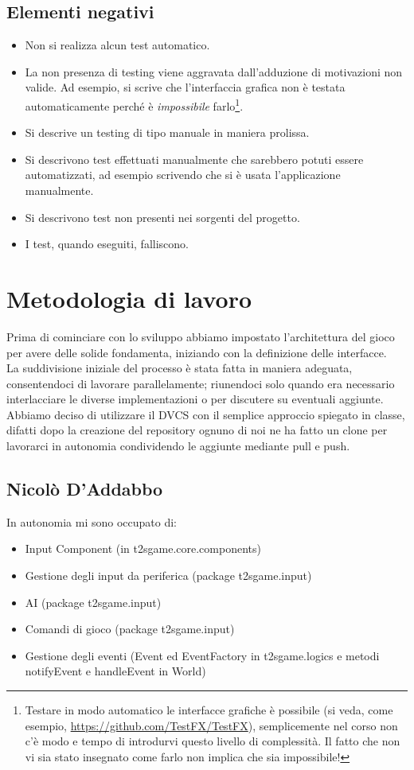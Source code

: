 \documentclass[a4paper,12pt]{report}
\begin{document}
\subsection*{Elementi negativi}
\begin{itemize}
 \item Non si realizza alcun test automatico.
 \item La non presenza di testing viene aggravata dall'adduzione di motivazioni non valide. Ad esempio, si scrive che l'interfaccia grafica non è testata automaticamente perché è \emph{impossibile} farlo\footnote{Testare in modo automatico le interfacce grafiche è possibile (si veda, come esempio, \url{https://github.com/TestFX/TestFX}), semplicemente nel corso non c'è modo e tempo di introdurvi questo livello di complessità. Il fatto che non vi sia stato insegnato come farlo non implica che sia impossibile!}.
 \item Si descrive un testing di tipo manuale in maniera prolissa.
 \item Si descrivono test effettuati manualmente che sarebbero potuti essere automatizzati, ad esempio scrivendo che si è usata l'applicazione manualmente.
 \item Si descrivono test non presenti nei sorgenti del progetto.
 \item I test, quando eseguiti, falliscono.
\end{itemize}

\section{Metodologia di lavoro}

Prima di cominciare con lo sviluppo abbiamo impostato l’architettura del gioco per avere delle solide fondamenta, iniziando con la definizione delle interfacce.
\\
La suddivisione iniziale del processo è stata fatta in maniera adeguata, consentendoci di lavorare parallelamente; riunendoci solo quando era necessario interlacciare le diverse implementazioni o per discutere su eventuali aggiunte.
\\
Abbiamo deciso di utilizzare il DVCS con il semplice approccio spiegato in classe, difatti dopo la creazione del repository ognuno di noi ne ha fatto un clone per lavorarci in autonomia condividendo le aggiunte mediante pull e push.

\subsection*{Nicolò D'Addabbo}
In autonomia mi sono occupato di:
\begin{itemize}
\item Input Component (in t2sgame.core.components)
\item Gestione degli input da periferica (package t2sgame.input)
\item AI (package t2sgame.input)
\item Comandi di gioco (package t2sgame.input)
\item Gestione degli eventi (Event ed EventFactory in t2sgame.logics e metodi notifyEvent e handleEvent in World)
\end{itemize}
\end{document}
